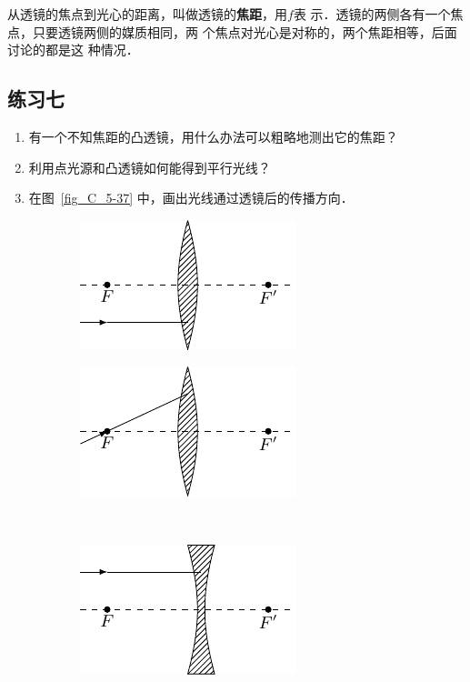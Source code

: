 从透镜的焦点到光心的距离，叫做透镜的\textbf{焦距}，用$f$表
示．透镜的两侧各有一个焦点，只要透镜两侧的媒质相同，两
个焦点对光心是对称的，两个焦距相等，后面讨论的都是这
种情况．

\subsection*{练习七}
\begin{enumerate}
    \item 有一个不知焦距的凸透镜，用什么办法可以粗略地测出它的焦距？
    \item 利用点光源和凸透镜如何能得到平行光线？
    \item 在图~\ref{fig_C_5-37} 中，画出光线通过透镜后的传播方向．
\end{enumerate}

\begin{figure}[htbp]
    \centering
    \begin{subfigure}{0.4\linewidth}
        \centering
        \includegraphics{fig/C/5-37a.pdf}
        \caption{}\label{fig_C_5-37a}
    \end{subfigure}
    \hfil
    \begin{subfigure}{0.4\linewidth}
        \centering
        \includegraphics{fig/C/5-37b.pdf}
        \caption{}\label{fig_C_5-37b}
    \end{subfigure}
    \\
    \begin{subfigure}{0.3\linewidth}
        \centering
        \includegraphics{fig/C/5-37c.pdf}

\end{subfigure}
\end{figure}
